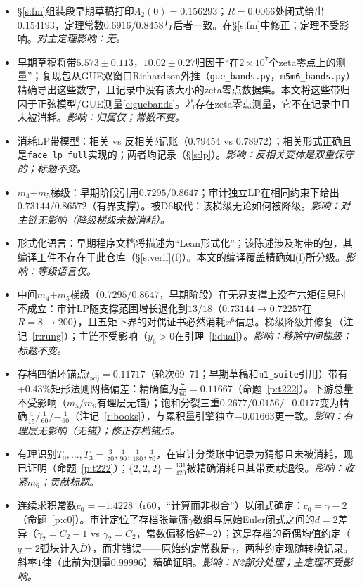 \documentclass[11pt]{article}
\numberwithin{equation}{section}
\theoremstyle{definition}
\theoremstyle{remark}
\begin{document}
\begin{itemize}
\item[D1.] \S\ref{s:fm}组装段早期草稿打印$\Lambda_2(0)=0.156293$；$\bar R=0.0066$处闭式给出$0.154193$，定理常数$0.6916/0.8458$与后者一致。在\S\ref{s:fm}中修正；定理不受影响。\emph{对主定理影响：无。}
\item[D2.] 早期草稿将带$5.573\pm0.113$，$10.02\pm0.27$归因于“在$2\times10^{7}$个zeta零点上的测量”；复现包从GUE双窗口Richardson外推（\texttt{gue\_bands.py}，\texttt{m5m6\_bands.py}）精确导出这些数字，且记录中没有该大小的zeta零点数据集。本文将这些带归因于正弦模型/GUE测量\eqref{e:guebands}。若存在zeta零点测量，它不在记录中且未被消耗。\emph{影响：归属仅；常数不变。}
\item[D3.] 消耗LP带模型：相关 vs 反相关$\delta$记账（$0.79454$ vs $0.78972$）；相关形式正确且是\texttt{face\_lp\_full}实现的；两者均记录（\S\ref{s:lp}）。\emph{影响：反相关变体是双重保守的；标题不变。}
\item[D4.] $m_4$+$m_5$梯级：早期阶段引用$0.7295/0.8647$；审计独立LP在相同约束下给出$0.73144/0.86572$（有界支撑）。被D6取代：该梯级无论如何被降级。\emph{影响：对主链无影响（降级梯级未被消耗）。}
\item[D5.] 形式化语言：早期程序文档将\cite{C26}描述为“Lean形式化”；该陈述涉及\cite{C26}附带的包，其编译工件不存在于此仓库（\S\ref{s:verif}(f)）。本文的编译覆盖精确如(f)所分级。\emph{影响：等级语言仅。}
\item[D6.] 中间$m_4$+$m_5$梯级（$0.7295/0.8647$，早期阶段）在无界支撑上没有六矩信息时不成立：审计LP随支撑范围增长退化到$13/18$（$0.73144\to0.72257$在$R=8\to200$），且五矩下界的对偶证书必然消耗$x^6$信息。梯级降级并修复（注记~\ref{r:rung}）；主链不受影响（$y_6>0$在引理~\ref{l:dual}）。\emph{影响：移除中间梯级；标题不变。}
\item[D7.] 存档四循环锚点$t_{\mathrm{adj}}=0.11717$（轮次69--71；早期草稿和\texttt{m1\_suite}引用）带有$+0.43\%$矩形法则网格偏差：精确值为$\tfrac7{60}=0.11667$（命题~\ref{p:t222}）。下游总量不受影响（$m_5$/$m_6$有理层无锚）；饱和分裂三重$0.2677/0.0156/{-0.0177}$变为精确$\tfrac4{15}/\tfrac1{60}/{-\tfrac1{60}}$（注记~\ref{r:books}），与累积量引擎独立$-0.01663$更一致。\emph{影响：有理层无影响（无锚）；修正存档锚点。}
\item[D8.] 有理识别$T_0,\dots,T_3=\tfrac3{70},\tfrac1{90},\tfrac1{180},\tfrac1{70}$，在审计分类账中记录为猜想且未被消耗，现已证明（命题~\ref{p:t222}）；$\{2,2,2\}=\tfrac{131}{420}$被精确消耗且其带贡献退役。\emph{影响：收紧$m_6$；贡献标题。}
\item[D9.] 连续求积常数$c_0=-1.4228$（r60，“计算而非拟合”）以闭式确定：$c_0=\gamma-2$（命题~\ref{p:c0}）。审计定位了存档张量筛$\gamma$数组与原始Euler闭式之间的$d=2$差异（$\widetilde\gamma_2=C_2-1$ vs $\gamma_2=C_2$，常数偏移恰好$-2$）；这是存档的奇偶均值约定（$q=2$弧块计入$\bar D$），而非错误——原始约定常数是$\gamma$，两种约定现随转换记录。斜率$1$律（此前为测量$0.99996$）精确证明。\emph{影响：N2部分处理；主定理不受影响。}

\end{itemize}
\end{document}
